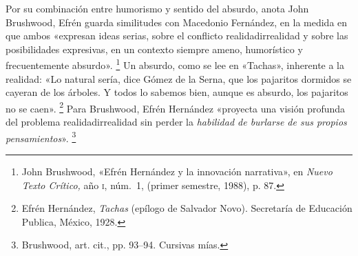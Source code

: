 \documentclass[14pt,twoside,final]{extbook} %
\let\oldfootnote\footnote
\renewcommand\footnote[1]{%
\oldfootnote{\hspace{1mm}#1}}
\begin{document}
Por su combinación entre humorismo y sentido del absurdo, anota John Brushwood, Efrén guarda similitudes con Macedonio Fernández, en la medida en que ambos «expresan ideas serias, sobre el conflicto realidad irrealidad y sobre las posibilidades expresivas, en un contexto siempre ameno, humorístico y frecuentemente absurdo».\footnote{John Brushwood, «Efrén Hernández y la innovación narrativa», en \emph{Nuevo Texto Crítico,} año \textsc{i}, núm.~1, (primer semestre, 1988), p. 87.} Un absurdo, como se lee en «Tachas», inherente a la realidad: «Lo natural sería, dice Gómez de la Serna, que los pajaritos dormidos se cayeran de los árboles. Y todos lo sabemos bien, aunque es absurdo, los pajaritos no se caen».\footnote{Efrén Hernández, \emph{Tachas} (epílogo de Salvador Novo). Secretaría de Educación Publica, México, 1928.} Para Brushwood, Efrén Hernández «proyecta una visión profunda del problema realidad irrealidad sin perder la \emph{habilidad de burlarse de sus propios pensamientos}».\footnote{Brushwood, art. cit., pp. 93--94. Cursivas mías.}
\end{document}
